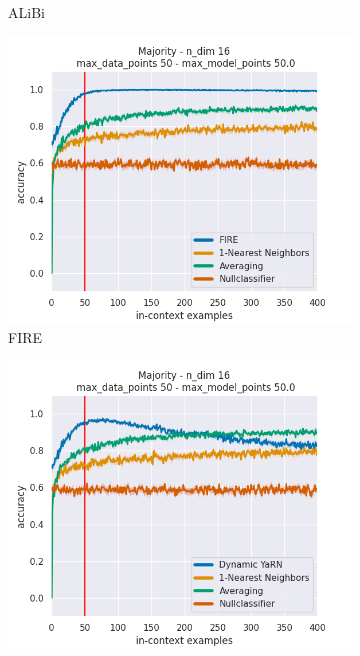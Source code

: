 \documentclass[letterpaper]{article} %
\begin{document}
\begin{figure}[tp]
\begin{subfigure}[t]{0.24\linewidth}
        \caption{ALiBi}
    \end{subfigure}
    \begin{subfigure}[t]{0.24\linewidth}
        \includegraphics[width=\linewidth]{AnonymousSubmission/LaTeX/imgs/experiments/majority/fire.png}
        \caption{FIRE}
    \end{subfigure}
    \begin{subfigure}[t]{0.24\linewidth}
        \includegraphics[width=\linewidth]{AnonymousSubmission/LaTeX/imgs/experiments/majority/dynamic-yarn.png}

\end{subfigure}
\end{figure}
\end{document}
